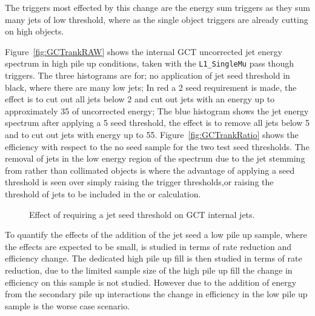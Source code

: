 The triggers most effected by this change are the energy sum triggers as they 
sum many jets of low threshold, where as the single object triggers are already 
cutting on high \ET objects.

Figure~\ref{fig:GCTrankRAW} shows the internal GCT uncorrected jet energy 
spectrum in high pile up conditions, taken with the \verb|L1_SingleMu| pass 
though triggers. The three histograms are for; no application of jet seed 
threshold in black, where there are many low \ET jets; In red a \unit{2}{\GeV} 
seed requirement is made, the effect is to cut out all jets below 
\unit{2}{\GeV} and cut out jets with an energy up to approximately 
\unit{35}{\GeV} of uncorrected energy; The blue histogram shows the jet energy 
spectrum after applying a \unit{5}{\GeV} seed threshold, the effect is to 
remove all jets below \unit{5}{\GeV} and to cut out jets with energy up to 
\unit{55}{\GeV}. Figure~\ref{fig:GCTrankRatio} shows the efficiency with 
respect to the no seed sample for the two test seed thresholds. The removal of 
jets in the low energy region of the \ET spectrum due to the jet stemming from \pu rather than collimated objects is where the advantage of applying a seed threshold is seen over simply raising the trigger thresholds,or raising the threshold of jets to be included in the \Lone \HT or \HTm calculation.


\begin{figure}[h!]
    \centering
    \caption{Effect of requiring a jet seed threshold on GCT internal jets.}
    \label{fig:GCTrank}
\end{figure}



To quantify the effects of the addition of the jet seed a low pile up sample, 
where the effects are expected to be small, is studied in terms of rate 
reduction and efficiency change. The dedicated high pile up fill is then 
studied in terms of rate reduction, due to the limited sample size of the high 
pile up fill the change in efficiency on this sample is not studied. However 
due to the addition of energy from the secondary pile up interactions the 
change in efficiency in the low pile up sample is the worse case scenario.

